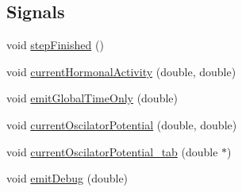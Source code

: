 \subsection*{Signals}
\begin{DoxyCompactItemize}
\item 
void \hyperlink{class_atrial_machine2d_aa0503c0b65de1d0a3353fa60001b7c7b}{step\+Finished} ()
\item 
void \hyperlink{class_atrial_machine2d_a6fd0e30ef398add561290bda4a8c7e1d}{current\+Hormonal\+Activity} (double, double)
\item 
void \hyperlink{class_atrial_machine2d_a5bc4b4d189faff85b485a0275a160a71}{emit\+Global\+Time\+Only} (double)
\item 
void \hyperlink{class_atrial_machine2d_ab95917c203cf726da282efcfb26241a3}{current\+Oscilator\+Potential} (double, double)
\item 
void \hyperlink{class_atrial_machine2d_a8a2f2c40ae228ee8a2cf6f7457acfd28}{current\+Oscilator\+Potential\+\_\+tab} (double $\ast$)
\item 
void \hyperlink{class_atrial_machine2d_a3c9c12d7d363a0a715a5d5f24aa075c8}{emit\+Debug} (double)
\end{DoxyCompactItemize}
